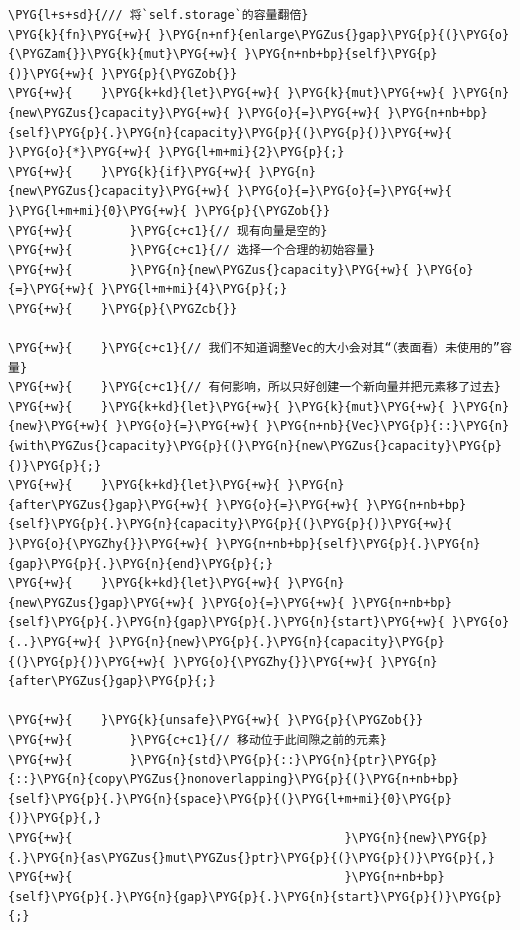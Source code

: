 \begin{Verbatim}[commandchars=\\\{\},breaklines=true,breakanywhere=true,fontsize=\codefont,xleftmargin=17bp]
\PYG{l+s+sd}{/// 将`self.storage`的容量翻倍}
\PYG{k}{fn}\PYG{+w}{ }\PYG{n+nf}{enlarge\PYGZus{}gap}\PYG{p}{(}\PYG{o}{\PYGZam{}}\PYG{k}{mut}\PYG{+w}{ }\PYG{n+nb+bp}{self}\PYG{p}{)}\PYG{+w}{ }\PYG{p}{\PYGZob{}}
\PYG{+w}{    }\PYG{k+kd}{let}\PYG{+w}{ }\PYG{k}{mut}\PYG{+w}{ }\PYG{n}{new\PYGZus{}capacity}\PYG{+w}{ }\PYG{o}{=}\PYG{+w}{ }\PYG{n+nb+bp}{self}\PYG{p}{.}\PYG{n}{capacity}\PYG{p}{(}\PYG{p}{)}\PYG{+w}{ }\PYG{o}{*}\PYG{+w}{ }\PYG{l+m+mi}{2}\PYG{p}{;}
\PYG{+w}{    }\PYG{k}{if}\PYG{+w}{ }\PYG{n}{new\PYGZus{}capacity}\PYG{+w}{ }\PYG{o}{=}\PYG{o}{=}\PYG{+w}{ }\PYG{l+m+mi}{0}\PYG{+w}{ }\PYG{p}{\PYGZob{}}
\PYG{+w}{        }\PYG{c+c1}{// 现有向量是空的}
\PYG{+w}{        }\PYG{c+c1}{// 选择一个合理的初始容量}
\PYG{+w}{        }\PYG{n}{new\PYGZus{}capacity}\PYG{+w}{ }\PYG{o}{=}\PYG{+w}{ }\PYG{l+m+mi}{4}\PYG{p}{;}
\PYG{+w}{    }\PYG{p}{\PYGZcb{}}

\PYG{+w}{    }\PYG{c+c1}{// 我们不知道调整Vec的大小会对其“（表面看）未使用的”容量}
\PYG{+w}{    }\PYG{c+c1}{// 有何影响，所以只好创建一个新向量并把元素移了过去}
\PYG{+w}{    }\PYG{k+kd}{let}\PYG{+w}{ }\PYG{k}{mut}\PYG{+w}{ }\PYG{n}{new}\PYG{+w}{ }\PYG{o}{=}\PYG{+w}{ }\PYG{n+nb}{Vec}\PYG{p}{::}\PYG{n}{with\PYGZus{}capacity}\PYG{p}{(}\PYG{n}{new\PYGZus{}capacity}\PYG{p}{)}\PYG{p}{;}
\PYG{+w}{    }\PYG{k+kd}{let}\PYG{+w}{ }\PYG{n}{after\PYGZus{}gap}\PYG{+w}{ }\PYG{o}{=}\PYG{+w}{ }\PYG{n+nb+bp}{self}\PYG{p}{.}\PYG{n}{capacity}\PYG{p}{(}\PYG{p}{)}\PYG{+w}{ }\PYG{o}{\PYGZhy{}}\PYG{+w}{ }\PYG{n+nb+bp}{self}\PYG{p}{.}\PYG{n}{gap}\PYG{p}{.}\PYG{n}{end}\PYG{p}{;}
\PYG{+w}{    }\PYG{k+kd}{let}\PYG{+w}{ }\PYG{n}{new\PYGZus{}gap}\PYG{+w}{ }\PYG{o}{=}\PYG{+w}{ }\PYG{n+nb+bp}{self}\PYG{p}{.}\PYG{n}{gap}\PYG{p}{.}\PYG{n}{start}\PYG{+w}{ }\PYG{o}{..}\PYG{+w}{ }\PYG{n}{new}\PYG{p}{.}\PYG{n}{capacity}\PYG{p}{(}\PYG{p}{)}\PYG{+w}{ }\PYG{o}{\PYGZhy{}}\PYG{+w}{ }\PYG{n}{after\PYGZus{}gap}\PYG{p}{;}

\PYG{+w}{    }\PYG{k}{unsafe}\PYG{+w}{ }\PYG{p}{\PYGZob{}}
\PYG{+w}{        }\PYG{c+c1}{// 移动位于此间隙之前的元素}
\PYG{+w}{        }\PYG{n}{std}\PYG{p}{::}\PYG{n}{ptr}\PYG{p}{::}\PYG{n}{copy\PYGZus{}nonoverlapping}\PYG{p}{(}\PYG{n+nb+bp}{self}\PYG{p}{.}\PYG{n}{space}\PYG{p}{(}\PYG{l+m+mi}{0}\PYG{p}{)}\PYG{p}{,}
\PYG{+w}{                                      }\PYG{n}{new}\PYG{p}{.}\PYG{n}{as\PYGZus{}mut\PYGZus{}ptr}\PYG{p}{(}\PYG{p}{)}\PYG{p}{,}
\PYG{+w}{                                      }\PYG{n+nb+bp}{self}\PYG{p}{.}\PYG{n}{gap}\PYG{p}{.}\PYG{n}{start}\PYG{p}{)}\PYG{p}{;}


\end{Verbatim}
